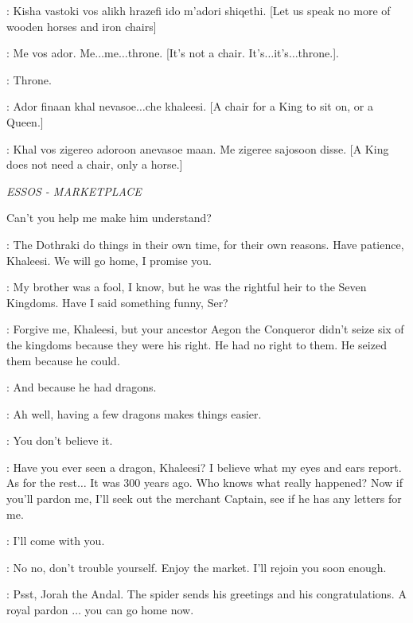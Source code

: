 \DROGO:  Kisha vastoki vos alikh hrazefi ido m'adori shiqethi. [Let us speak no more of wooden horses and iron chairs] 

\DAENERYS: Me vos ador. Me$\ldots$me$\ldots$throne. [It's not a chair. It's$\ldots$it's$\ldots$throne.]. 

\DROGO: Throne. 

\DAENERYS: Ador finaan khal nevasoe$\ldots$che khaleesi. [A chair for a King to sit on, or a Queen.] 

\DROGO: Khal vos zigereo adoroon anevasoe maan. Me zigeree sajosoon disse. [A King does not need a chair, only a horse.] 


\scene

\textit{ESSOS - MARKETPLACE} 


Can't you help me make him understand? 

\JORAH: The Dothraki do things in their own time, for their own reasons. Have patience, Khaleesi. We will go home, I promise you. 

\DAENERYS: My brother was a fool, I know, but he was the rightful heir to the Seven Kingdoms. Have I said something funny, Ser? 

\JORAH: Forgive me, Khaleesi, but your ancestor Aegon the Conqueror didn't seize six of the kingdoms because they were his right. He had no right to them. He seized them because he could. 

\DAENERYS: And because he had dragons. 

\JORAH: Ah well, having a few dragons makes things easier. 

\DAENERYS: You don't believe it. 

\JORAH: Have you ever seen a dragon, Khaleesi?  I believe what my eyes and ears report.  As for the rest$\ldots$ It was 300 years ago. Who knows what really happened?  Now if you'll pardon me, I'll seek out the merchant Captain, see if he has any letters for me. 

\DAENERYS: I'll come with you. 

\JORAH: No no, don't trouble yourself. Enjoy the market. I'll rejoin you soon enough. 


\BOY: Psst, Jorah the Andal.  The spider sends his greetings and his congratulations.  A royal pardon $\ldots$ you can go home now. 


